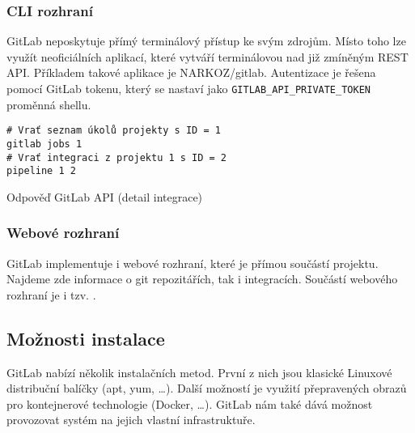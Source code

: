 \subsubsection{CLI rozhraní}

GitLab neposkytuje přímý terminálový přístup ke svým zdrojům.
Místo toho lze využít neoficiálních aplikací, které vytváří terminálovou  nad již zmíněným REST API.
Příkladem takové aplikace je NARKOZ/gitlab.
Autentizace je řešena pomocí GitLab tokenu, který se nastaví jako \verb|GITLAB_API_PRIVATE_TOKEN| proměnná shellu.

\begin{listing}[ht]
\begin{verbatim}
# Vrať seznam úkolů projekty s ID = 1
gitlab jobs 1
# Vrať integraci z projektu 1 s ID = 2
pipeline 1 2
\end{verbatim}
\label{code:gitlab-api}
\caption{Odpověď GitLab API (detail integrace)}
\end{listing}

\subsubsection{Webové rozhraní}

GitLab implementuje i webové rozhraní, které je přímou součástí projektu.
Najdeme zde informace o git repozitářích, tak i integracích.
Součástí webového rozhraní je i tzv. .


\subsection{Možnosti instalace}

GitLab nabízí několik instalačních metod.
První z nich jsou klasické Linuxové distribuční balíčky (apt, yum, \ldots).
Další možností je využití přepravených obrazů pro kontejnerové technologie (Docker, \ldots).
GitLab nám také dává možnost provozovat systém na jejich vlastní infrastruktuře.

